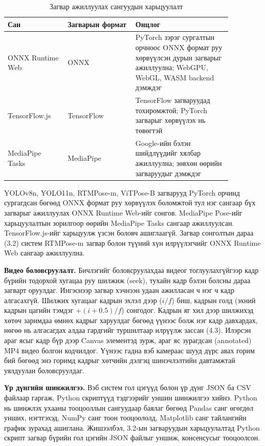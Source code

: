\begin{table}[H]
\centering
\caption{Загвар ажиллуулах сангуудын харьцуулалт}
\label{tab:runtimes}
\small
\begin{tabular}{|>{\raggedright\arraybackslash}p{0.234\linewidth}|>{\raggedright\arraybackslash}p{0.260\linewidth}|>{\raggedright\arraybackslash}p{0.372\linewidth}|}
\hline
\textbf{Сан} & \textbf{Загварын формат} & \textbf{Онцлог} \\ \hline
ONNX Runtime Web & ONNX & PyTorch зэрэг сургалтын орчноос ONNX формат руу хөрвүүлсэн дурын загварыг ажиллуулна; WebGPU, WebGL, WASM backend дэмждэг \\ \hline
TensorFlow.js & TensorFlow & TensorFlow загваруудад тохиромжтой; PyTorch загварыг хөрвүүлэх нь төвөгтэй \\ \hline
MediaPipe Tasks & MediaPipe & Google-ийн бэлэн шийдлүүдийг хялбар ажиллуулна; зөвхөн өөрийн загваруудыг дэмждэг \\ \hline
\end{tabular}
\end{table}

YOLOv8n, YOLO11n, RTMPose-m, ViTPose-B загварууд PyTorch орчинд сургагдсан бөгөөд ONNX формат руу хөрвүүлэх боломжтой тул нэг сангаар бүх загварыг ажиллуулах ONNX Runtime Web-ийг \cite{onnxruntime} сонгов. MediaPipe Pose-ийг харьцуулалтын зорилгоор өөрийн MediaPipe Tasks сангаар ажиллуулсан. TensorFlow.js-ийг харьцуулж үзсэн боловч ашиглаагүй. Загвар сонголтын дараа (3.2) систем RTMPose-m загвар болон түүний хүн илрүүлэгчийг ONNX Runtime Web сангаар ажиллуулна.

\textbf{Видео боловсруулалт.} Бичлэгийг боловсруулахдаа видеог тоглуулахгүйгээр кадр бүрийн тодорхой хугацаа руу шилжиж (seek), тухайн кадр бэлэн болсны дараа загварт оруулдаг. Ингэснээр загвар хэчнээн удаан ажилласан ч нэг ч кадр алгасахгүй. Шилжих хугацааг кадрын эхлэл дээр (\(i/f\)) биш, кадрын голд (эхний кадрын цагийн тэмдэг \(+ (i + 0.5)/f\)) сонгодог. Кадрын яг хил дээр шилжихэд хөтөч заримдаа өмнөх кадрыг харуулдаг бөгөөд үүнээс болж нэг кадр давхардах, нөгөө нь алгасагдах алдаа гардгийг туршилтаар илрүүлж зассан (4.3). Илэрсэн араг ясыг кадр бүр дээр Canvas элементэд зурж, араг яс зурагдсан (annotated) MP4 видео болгон кодчилдог. Үүнээс гадна вэб камераас шууд дүрс авах горим бий бөгөөд энэ горимд кадрыг хөтчийн дэлгэц шинэчлэлтийн давтамжтай уялдуулан боловсруулдаг.

\textbf{Үр дүнгийн шинжилгээ.} Вэб систем гол цэгүүд болон үр дүнг JSON ба CSV файлаар гаргаж, Python скриптүүд тэдгээрийг уншин шинжилгээ хийнэ. Python нь шинжлэх ухааны тооцооллын сангуудаар баялаг бөгөөд Pandas санг өгөгдөл унших, нэгтгэхэд, NumPy санг тоон тооцоололд, Matplotlib санг тайлангийн график зурахад ашиглана. Жишээлбэл, 3.2-ын загваруудын харьцуулалтад Python скрипт загвар бүрийн гол цэгийн JSON файлыг уншиж, консенсусыг тооцоолсон.

